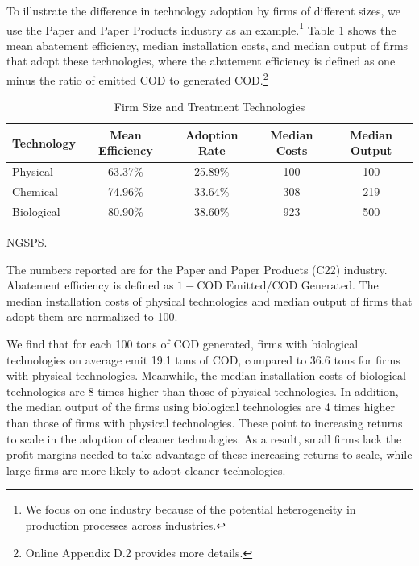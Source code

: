 \documentclass[AEJ]{AEA}
\begin{document}
To illustrate the difference in technology adoption by firms of different sizes, we use the Paper and Paper Products industry as an example.\footnote{We focus on one industry because of the potential heterogeneity in production processes across industries.} Table \ref{tab:techeffi} shows the mean abatement efficiency, median installation costs, and median output of firms that adopt these technologies, where the {abatement efficiency} is defined as one minus the ratio of {emitted COD} to {generated COD}.\footnote{Online Appendix D.2 provides more details.}
\begin{table}[t]
\footnotesize
\centering
\caption{Firm Size and Treatment Technologies}
\begin{tabular}{lcccc}
    \hline \hline
    Technology  & Mean Efficiency & Adoption Rate & Median Costs & Median Output \\
    \hline
    Physical    & 63.37\%         & 25.89\%       & 100                   & 100                       \\
    Chemical    & 74.96\%         & 33.64\%       & 308                   & 219                       \\
    Biological  & 80.90\%         & 38.60\%       & 923                   & 500                       \\
    \hline
\end{tabular}
\label{tab:techeffi}
\begin{tablenotes}[Source]
     NGSPS. 
\end{tablenotes}
\begin{tablenotes}
     The numbers reported are for the Paper and Paper Products (C22) industry. Abatement efficiency is defined as $1 - \text{COD Emitted}/\text{COD Generated}$. The median installation costs of physical technologies and median output of firms that adopt them are normalized to 100.
\end{tablenotes}
\end{table}
We find that for each 100 tons of COD generated, firms with biological technologies on average emit 19.1 tons of COD, compared to 36.6 tons for firms with physical technologies. Meanwhile, the median installation costs of biological technologies are 8 times higher than those of physical technologies. In addition, the median output of the firms using biological technologies are 4 times higher than those of firms with physical technologies. These point to increasing returns to scale in the adoption of cleaner technologies. As a result, small firms lack the profit margins needed to take advantage of these increasing returns to scale, while large firms are more likely to adopt cleaner technologies.
\end{document}
